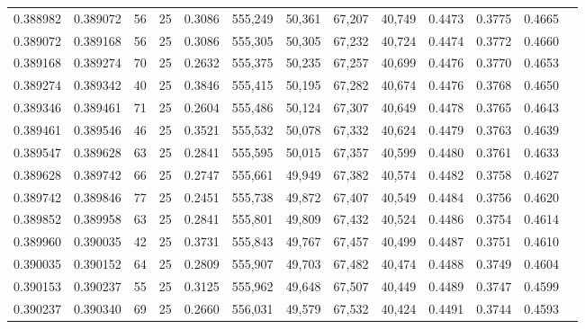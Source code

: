 \begin{tabular}{rrrrrrrrrrrrr}
0.388982 & 0.389072 &    56 &  25 &                                     0.3086 & 555,249 &  50,361 &  67,207 &  40,749 & 0.4473 & 0.3775 & 0.4665 \\
0.389072 & 0.389168 &    56 &  25 &                                     0.3086 & 555,305 &  50,305 &  67,232 &  40,724 & 0.4474 & 0.3772 & 0.4660 \\
0.389168 & 0.389274 &    70 &  25 &                                     0.2632 & 555,375 &  50,235 &  67,257 &  40,699 & 0.4476 & 0.3770 & 0.4653 \\
0.389274 & 0.389342 &    40 &  25 &                                     0.3846 & 555,415 &  50,195 &  67,282 &  40,674 & 0.4476 & 0.3768 & 0.4650 \\
0.389346 & 0.389461 &    71 &  25 &                                     0.2604 & 555,486 &  50,124 &  67,307 &  40,649 & 0.4478 & 0.3765 & 0.4643 \\
0.389461 & 0.389546 &    46 &  25 &                                     0.3521 & 555,532 &  50,078 &  67,332 &  40,624 & 0.4479 & 0.3763 & 0.4639 \\
0.389547 & 0.389628 &    63 &  25 &                                     0.2841 & 555,595 &  50,015 &  67,357 &  40,599 & 0.4480 & 0.3761 & 0.4633 \\
0.389628 & 0.389742 &    66 &  25 &                                     0.2747 & 555,661 &  49,949 &  67,382 &  40,574 & 0.4482 & 0.3758 & 0.4627 \\
0.389742 & 0.389846 &    77 &  25 &                                     0.2451 & 555,738 &  49,872 &  67,407 &  40,549 & 0.4484 & 0.3756 & 0.4620 \\
0.389852 & 0.389958 &    63 &  25 &                                     0.2841 & 555,801 &  49,809 &  67,432 &  40,524 & 0.4486 & 0.3754 & 0.4614 \\
0.389960 & 0.390035 &    42 &  25 &                                     0.3731 & 555,843 &  49,767 &  67,457 &  40,499 & 0.4487 & 0.3751 & 0.4610 \\
0.390035 & 0.390152 &    64 &  25 &                                     0.2809 & 555,907 &  49,703 &  67,482 &  40,474 & 0.4488 & 0.3749 & 0.4604 \\
0.390153 & 0.390237 &    55 &  25 &                                     0.3125 & 555,962 &  49,648 &  67,507 &  40,449 & 0.4489 & 0.3747 & 0.4599 \\
0.390237 & 0.390340 &    69 &  25 &                                     0.2660 & 556,031 &  49,579 &  67,532 &  40,424 & 0.4491 & 0.3744 & 0.4593 \\

\end{tabular}
